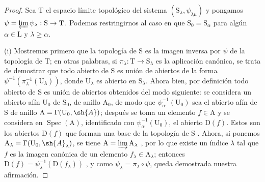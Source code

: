 \begin{proof}
Sea $\mathrm{T}$ el espacio límite topológico del sistema $(\mathrm{S}_\lambda,\psi_{\lambda\mu})$ y pongamos $\psi=\varprojlim\psi_\lambda:\mathrm{S}\to\mathrm{T}$.
Podemos restringirnos al caso en que $\mathrm{S}_0=\mathrm{S}_\alpha$ para algún $\alpha\in\mathrm{L}$ y $\lambda\geqslant\alpha$.

\medskip
\noindent
(i) Mostremos primero que la topología de $\mathrm{S}$ es la imagen inversa por $\psi$ de la topología de $\mathrm{T}$; en otras palabras, si $\pi_\lambda:\mathrm{T}\to\mathrm{S}_\lambda$ es la aplicación canónica, se trata de demostrar que todo abierto de $\mathrm{S}$ es unión de abiertos de la forma $\psi^{-1}(\pi_\lambda^{-1}(\mathrm{U}_\lambda))$, donde $\mathrm{U}_\lambda$ es abierto en $\mathrm{S}_\lambda$.
Ahora bien, por definición todo abierto de $\mathrm{S}$ es unión de abiertos obtenidos del modo siguiente: se considera un abierto afín $\mathrm{U}_0$ de $\mathrm{S}_0$, de anillo $\mathrm{A}_0$, de modo que $\psi_\alpha^{-1}(\mathrm{U}_0)$ sea el abierto afín de $\mathrm{S}$ de anillo $\mathrm{A}=\Gamma(\mathrm{U}_0,\sh{A})$; después se toma un elemento $f\in\mathrm{A}$ y se considera en $\operatorname{Spec}(\mathrm{A})$, identificado con $\psi_\alpha^{-1}(\mathrm{U}_0)$, el abierto $\mathrm{D}(f)$.
Estos son los abiertos $\mathrm{D}(f)$ que forman una base de la topología de $\mathrm{S}$ .
Ahora, si ponemos $\mathrm{A}_\lambda=\Gamma(\mathrm{U}_0,\sh{A}_\lambda)$, se tiene $\mathrm{A}=\varinjlim\mathrm{A}_\lambda$ , por lo que existe un índice $\lambda$ tal que $f$ es la imagen canónica de un elemento $f_\lambda\in\mathrm{A}_\lambda$; entonces $\mathrm{D}(f)=\psi_\lambda^{-1}(\mathrm{D}(f_\lambda))$ , y como $\psi_\lambda=\pi_\lambda\circ\psi$, queda demostrada nuestra afirmación.


\end{proof}
